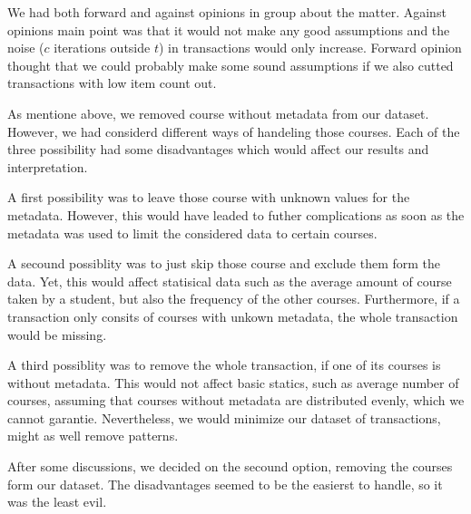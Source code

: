 We had both forward and against opinions
in group about the matter. Against opinions main point was that it would not make any good assumptions 
and the noise ($c$ iterations outside $t$) in transactions would only increase. Forward opinion thought that
we could probably make some sound assumptions if we also cutted transactions with low item count out.


As mentione above, we removed course without metadata from our dataset. However, we had considerd different ways of handeling those courses.
Each of the three possibility had  some disadvantages which would affect our results and interpretation.


A first possibility was to leave those course with unknown values for the metadata. However, this would have leaded to 
futher complications as soon as the metadata was used to limit the considered data to certain courses. 


A secound possiblity was to just skip those course and exclude them form the data. Yet, this would affect
statisical data such as the average amount of course taken by a student, but also the frequency of the other courses.
Furthermore, if a transaction only consits of courses with unkown metadata, the whole transaction would be missing.


A third possiblity was to remove the whole transaction, if one of its courses is without metadata. 
This would not affect basic statics, such as average number of courses, assuming that courses without metadata are distributed evenly, which we cannot garantie.
Nevertheless, we would minimize our dataset of transactions, might as well remove patterns.
\newline

After some discussions, we decided on the secound option, removing the courses form our dataset. The disadvantages seemed to be the easierst to handle, so it was the least evil. 



